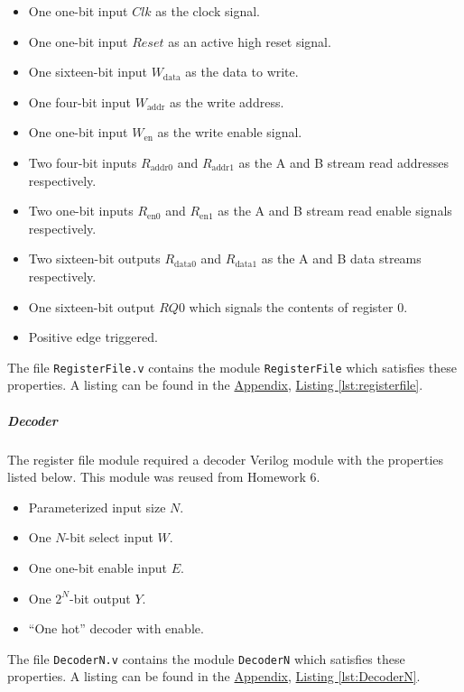 \begin{itemize}
    \item One one-bit input $Clk$ as the clock signal.
    \item One one-bit input $Reset$ as an active high reset signal.
    \item One sixteen-bit input $W_\text{data}$ as the data to write.
    \item One four-bit input $W_\text{addr}$ as the write address.
    \item One one-bit input $W_\text{en}$ as the write enable signal.
    \item Two four-bit inputs $R_\text{addr0}$ and $R_\text{addr1}$ as the A and B stream read addresses respectively.
    \item Two one-bit inputs $R_\text{en0}$ and $R_\text{en1}$ as the A and B stream read enable signals respectively.
    \item Two sixteen-bit outputs $R_\text{data0}$ and $R_\text{data1}$ as the A and B data streams respectively.
    \item One sixteen-bit output $RQ0$ which signals the contents of register 0.
    \item Positive edge triggered.
\end{itemize}

The file \verb|RegisterFile.v| contains the module \verb|RegisterFile| which satisfies these properties.
A listing can be found in the \hyperref[sec:appendix]{Appendix}, \hyperref[lst:registerfile]{Listing \ref*{lst:registerfile}}.

\subparagraph{Decoder}

The register file module required a decoder Verilog module with the properties listed below.
This module was reused from Homework 6.

\begin{itemize}
    \item Parameterized input size $N$.
    \item One $N$-bit select input $W$.
    \item One one-bit enable input $E$.
    \item One $2^N$-bit output $Y$.
    \item ``One hot'' decoder with enable.
\end{itemize}

The file \verb|DecoderN.v| contains the module \verb|DecoderN| which satisfies these properties.
A listing can be found in the \hyperref[sec:appendix]{Appendix}, \hyperref[lst:DecoderN]{Listing \ref*{lst:DecoderN}}.

